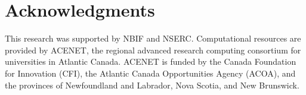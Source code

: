 \documentclass[11pt]{article}
\begin{document}
\section*{Acknowledgments}


This research was supported by NBIF and NSERC. Computational resources are provided by ACENET, the regional advanced research computing consortium for universities in Atlantic Canada. ACENET is funded by the Canada Foundation for Innovation (CFI), the Atlantic Canada Opportunities Agency (ACOA), and the provinces of Newfoundland and Labrador, Nova Scotia, and New Brunswick.





%
%

\appendix
\end{document}
